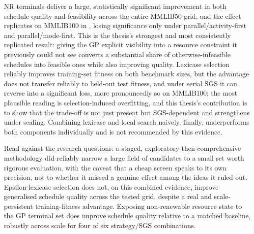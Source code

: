  NR
terminals deliver a large, statistically significant improvement in both
schedule quality and feasibility across the entire MMLIB50 grid, and the
effect replicates on MMLIB100 in , losing significance
only under parallel/activity-first and
parallel/mode-first. This is the thesis's strongest and most consistently
replicated result: giving the GP explicit visibility into a resource
constraint it previously could not see converts a substantial share of
otherwise-infeasible schedules into feasible ones while also improving
quality. 
Lexicase selection reliably improves training-set fitness on both
benchmark sizes, but the advantage does not transfer reliably to held-out
test fitness, and under serial SGS it can reverse into a significant loss,
more pronouncedly so on MMLIB100; the most plausible reading is
selection-induced overfitting, and this thesis's contribution is to show
that the trade-off is not just present but SGS-dependent and strengthens
under scaling. 
 Combining lexicase and local search naively, finally,
underperforms both components individually and is not recommended by this
evidence.

Read against the research questions: a staged,
exploratory-then-comprehensive methodology did reliably narrow a large
field of candidates to a small set worth rigorous evaluation, with the
caveat that a cheap screen speaks to its own precision, not to whether it
missed a genuine effect among the ideas it ruled out. Epsilon-lexicase
selection does not, on this combined evidence, improve generalised schedule
quality across the tested grid, despite a real and scale-persistent
training-fitness advantage.  Exposing non-renewable resource state
to the GP terminal set does improve schedule quality relative to a matched
baseline, robustly across scale for four of six strategy/SGS combinations.

